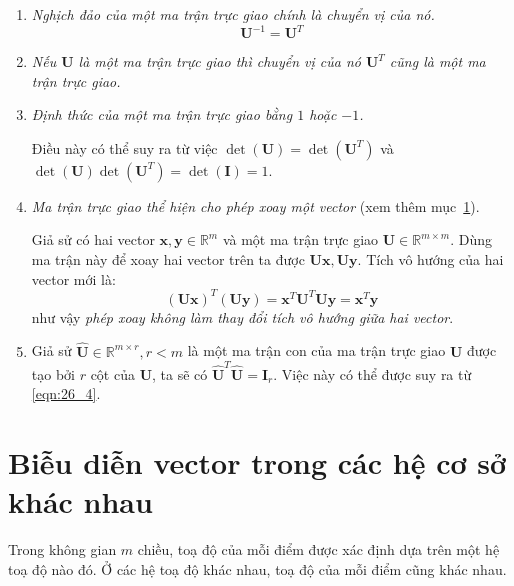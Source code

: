 \begin{enumerate}

    \item \textit{Nghịch đảo của một ma trận trực giao chính là chuyển vị của
    nó.}
    \begin{equation*}
        \mathbf{U}^{-1} = \mathbf{U}^T        
    \end{equation*}
    \item \textit{Nếu $\mathbf{U}$ là một ma trận trực giao thì chuyển vị của nó
        $\mathbf{U}^T$ cũng là một ma trận trực giao.}
    \item \textit{Định thức của một ma trận trực giao bằng $1$ hoặc $-1$.}

    Điều này có thể suy ra từ việc $\det(\mathbf{U}) = \det(\mathbf{U}^T)$ và
    $\det(\mathbf{U}) \det(\mathbf{U}^T) = \det(\mathbf{I}) = 1$.

    \item \textit{Ma trận trực giao thể hiện cho phép xoay một vector} (xem thêm
        mục~\ref{sec:doi_he_co_so}). 

    Giả sử có hai vector $\mathbf{x,y} \in \mathbb{R}^m$ và một ma trận trực
    giao $\mathbf{U} \in \mathbb{R}^{m \times m}$. Dùng ma trận này để xoay hai
    vector trên ta được $\mathbf{Ux}, \mathbf{Uy}$. Tích vô hướng của hai vector
    mới là:
    \begin{equation*}
    (\mathbf{Ux})^T (\mathbf{Uy}) = \mathbf{x}^T \mathbf{U}^T \mathbf{Uy} = \mathbf{x}^T\mathbf{y}
    \end{equation*}
    như vậy \textit{phép xoay không làm thay đổi tích vô hướng giữa hai vector}.

    \item Giả sử $\hat{\mathbf{U}} \in \mathbb{R}^{m \times r}, r < m$ là một ma
    trận con của ma trận trực giao $\mathbf{U}$ được tạo bởi $r$ cột của
    $\mathbf{U}$, ta sẽ có $\hat{\mathbf{U}}^T\hat{\mathbf{U}} =
    \mathbf{I}_{r}$. Việc này có thể được suy ra từ \eqref{eqn:26_4}.

\end{enumerate}



\section{Biễu diễn vector trong các hệ cơ sở khác nhau}
\label{sec:doi_he_co_so}
Trong không gian $m$ chiều, toạ độ của mỗi điểm được xác định dựa trên một hệ
toạ độ nào đó. Ở các hệ toạ độ khác nhau, toạ độ của mỗi điểm cũng khác nhau.

